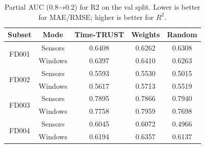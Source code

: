 \begin{table}[t]
\centering
\caption{Partial AUC (0.8→0.2) for R2 on the val split. Lower is better for MAE/RMSE; higher is better for $R^2$.}
\label{tab:auc_r2_val}
\begin{tabular}{|c|c|c|c|c|}
\hline
Subset & Mode & Time-TRUST & Weights & Random \\
\hline
\multirow{2}{*}{FD001} & Sensors & 0.6408 & 0.6262 & 0.6308 \\
 & Windows & 0.6397 & 0.6410 & 0.6263 \\
\hline
\multirow{2}{*}{FD002} & Sensors & 0.5593 & 0.5530 & 0.5015 \\
 & Windows & 0.5617 & 0.5713 & 0.5519 \\
\hline
\multirow{2}{*}{FD003} & Sensors & 0.7895 & 0.7866 & 0.7940 \\
 & Windows & 0.7758 & 0.7959 & 0.7698 \\
\hline
\multirow{2}{*}{FD004} & Sensors & 0.6045 & 0.6072 & 0.4966 \\
 & Windows & 0.6194 & 0.6357 & 0.6137 \\
\hline
\end{tabular}
\end{table}
